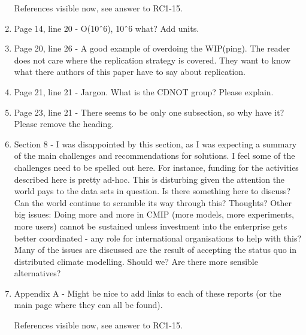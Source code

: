 \documentclass[gmd,manuscript]{copernicus}
\newenvironment{answer}{\color{blue}}{}
\begin{document}
\begin{enumerate}[label=RC3-\arabic*,leftmargin=*]
  \begin{answer}
    References visible now, see answer to RC1-15.
  \end{answer}
\item Page 14, line 20 - O(10ˆ6), 10ˆ6 what? Add units.
\item Page 20, line 26 - A good example of overdoing the WIP(ping).
  The reader does not care where the replication strategy is covered.
  They want to know what there authors of this paper have to say about
  replication.
\item Page 21, line 21 - Jargon. What is the CDNOT group? Please
  explain.
\item Page 23, line 21 - There seems to be only one subsection, so why
  have it? Please remove the heading.
\item Section 8 - I was disappointed by this section, as I was
  expecting a summary of the main challenges and recommendations for
  solutions. I feel some of the challenges need to be spelled out
  here. For instance, funding for the activities described here is
  pretty ad-hoc. This is disturbing given the attention the world pays
  to the data sets in question. Is there something here to discuss?
  Can the world continue to scramble its way through this? Thoughts?
  Other big issues: Doing more and more in CMIP (more models, more
  experiments, more users) cannot be sustained unless investment into
  the enterprise gets better coordinated - any role for international
  organisations to help with this? Many of the issues are discussed
  are the result of accepting the status quo in distributed climate
  modelling. Should we? Are there more sensible alternatives?
\item Appendix A - Might be nice to add links to each of these reports
  (or the main page where they can all be found).

  \begin{answer}
    References visible now, see answer to RC1-15.
  \end{answer}
\end{enumerate}
\end{document}
